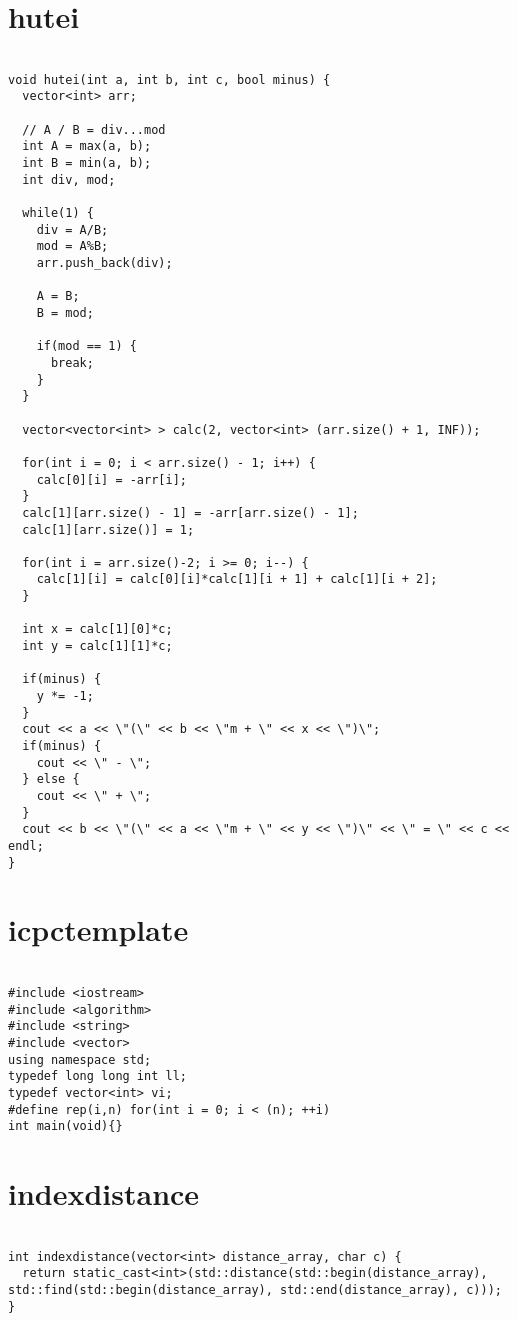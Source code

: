 \documentclass[a4j,titlepage]{jarticle} %
\begin{document}
\section{hutei}
\color{black}
\begin{lstlisting}[caption=hutei]

void hutei(int a, int b, int c, bool minus) {
  vector<int> arr;

  // A / B = div...mod
  int A = max(a, b);
  int B = min(a, b);
  int div, mod;

  while(1) {
    div = A/B;
    mod = A%B;
    arr.push_back(div);

    A = B;
    B = mod;

    if(mod == 1) {
      break;
    }
  }

  vector<vector<int> > calc(2, vector<int> (arr.size() + 1, INF));

  for(int i = 0; i < arr.size() - 1; i++) {
    calc[0][i] = -arr[i];
  }
  calc[1][arr.size() - 1] = -arr[arr.size() - 1];
  calc[1][arr.size()] = 1;

  for(int i = arr.size()-2; i >= 0; i--) {
    calc[1][i] = calc[0][i]*calc[1][i + 1] + calc[1][i + 2];
  }

  int x = calc[1][0]*c;
  int y = calc[1][1]*c;

  if(minus) {
    y *= -1;
  }
  cout << a << \"(\" << b << \"m + \" << x << \")\";
  if(minus) {
    cout << \" - \";
  } else {
    cout << \" + \";
  }
  cout << b << \"(\" << a << \"m + \" << y << \")\" << \" = \" << c << endl;
}

\end{lstlisting}

\color{white}
\section{icpctemplate}
\color{black}
\begin{lstlisting}[caption=icpctemplate]

#include <iostream>
#include <algorithm>
#include <string>
#include <vector>
using namespace std;
typedef long long int ll;
typedef vector<int> vi;
#define rep(i,n) for(int i = 0; i < (n); ++i)
int main(void){}

\end{lstlisting}

\color{white}
\section{indexdistance}
\color{black}
\begin{lstlisting}[caption=indexdistance]

int indexdistance(vector<int> distance_array, char c) {
  return static_cast<int>(std::distance(std::begin(distance_array), std::find(std::begin(distance_array), std::end(distance_array), c)));
}

\end{lstlisting}
\end{document}
